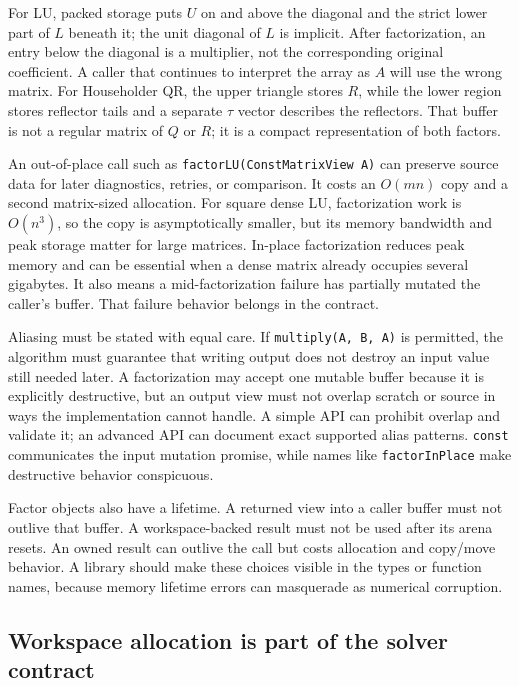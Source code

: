 For LU, packed storage puts \(U\) on and above the diagonal and the strict lower part of \(L\) beneath it; the unit diagonal of \(L\) is implicit. After factorization, an entry below the diagonal is a multiplier, not the corresponding original coefficient. A caller that continues to interpret the array as \(A\) will use the wrong matrix. For Householder QR, the upper triangle stores \(R\), while the lower region stores reflector tails and a separate \(\tau\) vector describes the reflectors. That buffer is not a regular matrix of \(Q\) or \(R\); it is a compact representation of both factors.

An out-of-place call such as \texttt{factorLU(ConstMatrixView\ A)} can preserve source data for later diagnostics, retries, or comparison. It costs an \(O(mn)\) copy and a second matrix-sized allocation. For square dense LU, factorization work is \(O(n^3)\), so the copy is asymptotically smaller, but its memory bandwidth and peak storage matter for large matrices. In-place factorization reduces peak memory and can be essential when a dense matrix already occupies several gigabytes. It also means a mid-factorization failure has partially mutated the caller's buffer. That failure behavior belongs in the contract.

Aliasing must be stated with equal care. If \texttt{multiply(A,\ B,\ A)} is permitted, the algorithm must guarantee that writing output does not destroy an input value still needed later. A factorization may accept one mutable buffer because it is explicitly destructive, but an output view must not overlap scratch or source in ways the implementation cannot handle. A simple API can prohibit overlap and validate it; an advanced API can document exact supported alias patterns. \texttt{const} communicates the input mutation promise, while names like \texttt{factorInPlace} make destructive behavior conspicuous.

Factor objects also have a lifetime. A returned view into a caller buffer must not outlive that buffer. A workspace-backed result must not be used after its arena resets. An owned result can outlive the call but costs allocation and copy/move behavior. A library should make these choices visible in the types or function names, because memory lifetime errors can masquerade as numerical corruption.

\subsection{Workspace allocation is part of the solver contract}\label{workspace-allocation-is-part-of-the-solver-contract}

